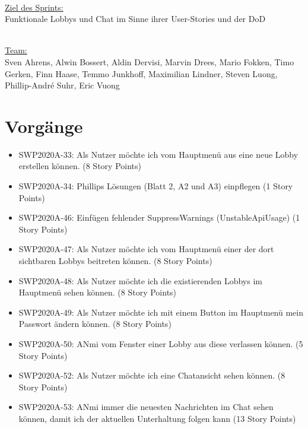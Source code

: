 \documentclass[12pt,a4paper, oneside]{article}
\begin{document}
    \noindent
    \\
    \underline{Ziel des Sprints:}
    \\
    Funktionale Lobbys und Chat im Sinne ihrer User-Stories und der DoD

    \noindent
    \\
    \underline {Team:}
    \\
    Sven Ahrens, Alwin Bossert, Aldin Dervisi, Marvin Drees, Mario Fokken,
    Timo Gerken, Finn Haase, Temmo Junkhoff, Maximilian Lindner, Steven Luong, Phillip-André Suhr, Eric Vuong


    \section{Vorgänge}

    \begin{itemize}
        \item SWP2020A-33: Als Nutzer möchte ich vom Hauptmenü aus eine neue Lobby erstellen können. (8 Story Points)

        \item SWP2020A-34: Phillips Lösungen (Blatt 2, A2 und A3) einpflegen (1 Story Points)

        \item SWP2020A-46: Einfügen fehlender SuppressWarnings (UnstableApiUsage) (1 Story Points)

        \item SWP2020A-47: Als Nutzer möchte ich vom Hauptmenü einer der dort sichtbaren Lobbys beitreten können. (8 Story Points)

        \item SWP2020A-48: Als Nutzer möchte ich die existierenden Lobbys im Hauptmenü sehen können. (8 Story Points)

        \item SWP2020A-49: Als Nutzer möchte ich mit einem Button im Hauptmenü mein Passwort ändern können. (8 Story Points)

        \item SWP2020A-50: ANmi vom Fenster einer Lobby aus diese verlassen können. (5 Story Points)

        \item SWP2020A-52: Als Nutzer möchte ich eine Chatansicht sehen können. (8 Story Points)

        \item SWP2020A-53: ANmi immer die neuesten Nachrichten im Chat sehen können, damit ich der aktuellen Unterhaltung folgen kann (13 Story Points)

    \end{itemize}
\end{document}
